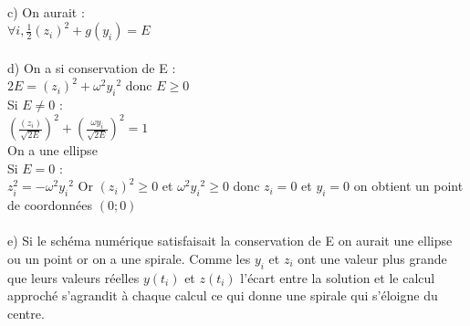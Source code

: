 \documentclass{article}
\begin{document}
c) On aurait : \\
$\forall i, \frac{1}{2} (z_i)^2 + g(y_i)=E$ \\
 \\
d) On a si conservation de E : \\
$2E= (z_{i})^2 + \omega^2 {y_i}^2$ donc $E\geq 0$ \\
Si $E \neq 0$ :\\
$(\frac{(z_{i})}{\sqrt{2E}})^2 + (\frac{\omega y_i}{\sqrt{2E}})^2=1$ \\
On a une ellipse \\
Si $E=0$ : \\
$z_{i}^2 = - \omega^2 {y_i}^2$ Or $(z_i)^2 \geq 0$ et $\omega^2 {y_i}^2 \geq 0$ donc $z_i=0$ et $y_i=0$ on obtient un point de coordonnées $(0;0)$ \\
\\
e) Si le schéma numérique satisfaisait la conservation de E on aurait une ellipse ou un point or on a une spirale. Comme les $y_i$ et $z_i$ ont une valeur plus grande que leurs valeurs réelles $y(t_i)$ et $z(t_i)$ l'écart entre la solution et le calcul approché s'agrandit à chaque calcul ce qui donne une spirale qui s'éloigne du centre. \\
\end{document}
